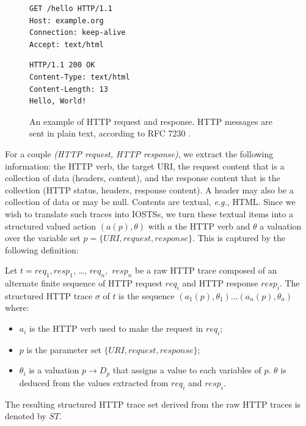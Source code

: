 \begin{figure}[ht]
\begin{framed}
\begin{BVerbatim}
GET /hello HTTP/1.1
Host: example.org
Connection: keep-alive
Accept: text/html
\end{BVerbatim}
\end{framed}

\begin{framed}
\begin{BVerbatim}
HTTP/1.1 200 OK
Content-Type: text/html
Content-Length: 13
Hello, World!
\end{BVerbatim}
\end{framed}

    \caption{An example of HTTP request and response. HTTP messages
    are sent in plain text, according to RFC 7230 \cite{RFC7230}.}
    \label{fig:httpexample}
\end{figure}

For a couple \textit{(HTTP request, HTTP response)}, we extract
the following information: the HTTP verb, the target URI, the
request content that is a collection of data (headers, content),
and the response content that is the collection (HTTP status,
headers, response content). A header may also be a collection of
data or may be null. Contents are textual, \emph{e.g.}, HTML.
Since we wish to translate such traces into IOSTSs, we turn these
textual items into a structured valued action $(a(p),\theta)$
with $a$ the HTTP verb and $\theta$ a valuation over the variable
set $p=\{URI,request,response\}$. This is captured by the
following definition:

\begin{definition} Let $t=
req_1,resp_1$, \dots, $req_n,$ $resp_n$ be a raw HTTP trace
composed of an alternate finite sequence of HTTP request $req_i$
and HTTP response $resp_i$. The structured HTTP trace $\sigma$ of
$t$ is the sequence $(a_1(p),\theta_1) \dots (a_n(p),\theta_n)$
where:

\begin{itemize}
    \item $a_i$ is the HTTP verb used to make the request in
        $req_i$;

    \item $p$ is the parameter set $\{URI, request, response\}$;

    \item $\theta_i$ is a valuation $p \rightarrow D_p$ that
        assigns a value to each variables of $p$.  $\theta$ is
        deduced from the values extracted from $req_i$ and
        $resp_i$.
\end{itemize}

The resulting structured HTTP trace set derived from the raw HTTP
traces is denoted by $ST$.
\end{definition}


